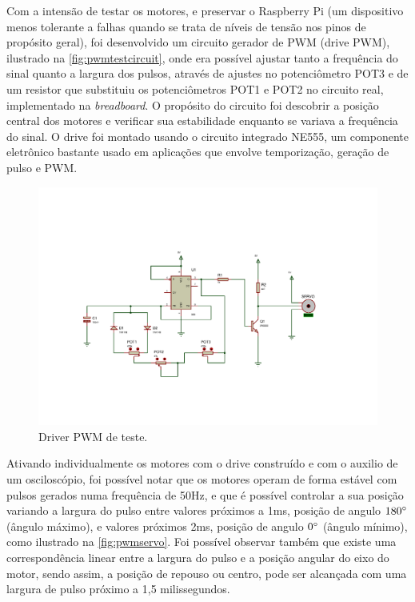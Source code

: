 Com a intensão de testar os motores, e preservar o Raspberry Pi (um dispositivo menos tolerante a falhas quando se trata de níveis de tensão nos pinos de propósito geral), foi desenvolvido um circuito gerador de PWM (drive PWM), ilustrado na \autoref{fig:pwmtestcircuit}, onde era possível ajustar tanto a frequência do sinal quanto a largura dos pulsos, através de ajustes no potenciômetro POT3 e de um resistor que substituiu os potenciômetros POT1 e POT2 no circuito real, implementado na \textit{breadboard}. O propósito do circuito foi descobrir a posição central dos motores e verificar sua estabilidade enquanto se variava a frequência do sinal. O drive foi montado usando o circuito integrado NE555, um componente eletrônico bastante usado em aplicações que envolve temporização, geração de pulso e PWM. \par

\begin{figure}[H]
	\centering
	\includegraphics[trim={2.5cm 3cm 4cm 5cm},clip,width=1\textwidth]{figuras/pwm2.pdf}
	\caption{Driver PWM de teste.}
	\label{fig:pwmtestcircuit}
\end{figure}

Ativando individualmente os motores com o drive construído e com o auxilio de um osciloscópio, foi possível notar que os motores operam de forma estável com pulsos gerados numa frequência de 50Hz, e que é possível controlar a sua posição variando a largura do pulso entre valores próximos a 1ms, posição de angulo $180\degree$ (ângulo máximo), e valores próximos 2ms, posição de angulo $0\degree$ (ângulo mínimo), como ilustrado na \autoref{fig:pwmservo}. Foi possível observar também que existe uma correspondência linear entre a largura do pulso e a posição angular do eixo do motor, sendo assim, a posição de repouso ou centro, pode ser alcançada com uma largura de pulso próximo a 1,5 milissegundos. 

